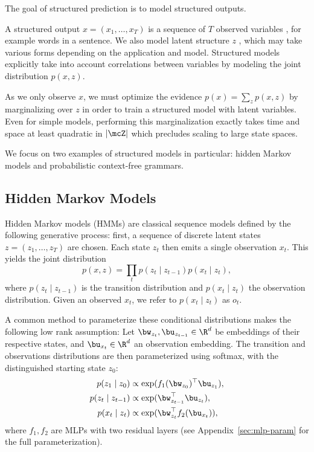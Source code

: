 
The goal of structured prediction is to model structured outputs.

A structured output $x=(x_1, \dots, x_T)$ is a sequence of $T$ observed variables %
, for example words in a sentence.
We also model latent structure $z$ , which may take various forms depending on the application and model.
Structured models explicitly take into account correlations between variables by modeling the joint distribution $p(x,z)$.

As we only observe $x$, we must optimize the evidence $p(x) = \sum_z p(x,z)$ by marginalizing over $z$ in order to train a structured model with latent variables. Even for simple models, performing this marginalization exactly takes time and space at least quadratic in $|\mcZ|$ which precludes scaling to large state spaces.

We focus on two examples of structured models in particular:
hidden Markov models and probabilistic context-free grammars.

\subsection*{Hidden Markov Models}
Hidden Markov models (HMMs) are classical sequence models
defined by the following generative process: first, a sequence of discrete latent states $z = (z_1, \ldots,z_T)$ are chosen. Each state $z_t$ then emits a single observation $x_t$.
This yields the joint distribution
\begin{equation}
\label{eqn:hmm}
    p(x,z) = \prod_t p(z_t \mid z_{t-1})p(x_t\mid z_t),
\end{equation}
where $p(z_t \mid z_{t-1})$ is the transition distribution
and $p(x_t \mid z_t)$ the observation distribution.
Given an observed $x_t$, we refer to $p(x_t \mid z_t)$ as $o_t$.

A common method to parameterize these conditional distributions makes the following low rank assumption:
Let $\bw_{z_t},\bu_{z_{t-1}}\in\R^d$ be embeddings of their respective states, and $\bu_{x_t}\in\R^d$ an observation embedding.
The transition and observations distributions are then parameterized using softmax, with the distinguished starting state $z_0$:
\begin{equation}
\begin{aligned}
p(z_1 \mid z_0) &\propto \exp(f_1(\bw_{z_0})^\top\bu_{z_1}),\\
p(z_t \mid z_{t-1}) &\propto \exp(\bw_{z_{t-1}}^\top\bu_{z_t}),\\
p(x_t \mid z_t) &\propto \exp(\bw_{z_t}^\top f_2(\bu_{x_t})),
\end{aligned}
\end{equation}
where $f_1, f_2$ are MLPs with two residual layers (see Appendix~\ref{sec:mlp-param} for the full parameterization).

